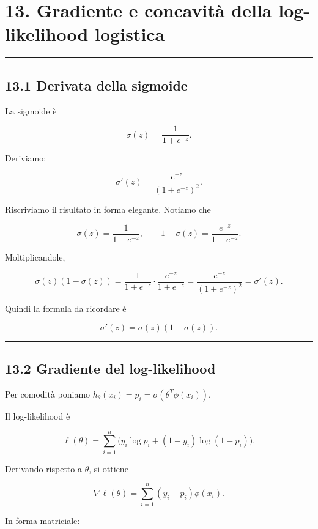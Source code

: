 \documentclass[
]{article}
\begin{document}
\section{13. Gradiente e concavità della log-likelihood
logistica}\label{gradiente-e-concavituxe0-della-log-likelihood-logistica}

\begin{center}\rule{0.5\linewidth}{0.5pt}\end{center}

\subsection{13.1 Derivata della sigmoide}\label{derivata-della-sigmoide}

La sigmoide è

\[
\sigma(z)=\frac{1}{1+e^{-z}}.
\]

Deriviamo:

\[
\sigma'(z)
=
\frac{e^{-z}}{(1+e^{-z})^2}.
\]

Riscriviamo il risultato in forma elegante. Notiamo che

\[
\sigma(z)=\frac{1}{1+e^{-z}},
\qquad
1-\sigma(z)=\frac{e^{-z}}{1+e^{-z}}.
\]

Moltiplicandole,

\[
\sigma(z)(1-\sigma(z))
=
\frac{1}{1+e^{-z}}
\cdot
\frac{e^{-z}}{1+e^{-z}}
=
\frac{e^{-z}}{(1+e^{-z})^2}
=
\sigma'(z).
\]

Quindi la formula da ricordare è

\[
\sigma'(z)=\sigma(z)(1-\sigma(z)).
\]

\begin{center}\rule{0.5\linewidth}{0.5pt}\end{center}

\subsection{13.2 Gradiente del
log-likelihood}\label{gradiente-del-log-likelihood}

Per comodità poniamo \(h_\theta(x_i)=p_i=\sigma(\theta^T\phi(x_i))\).

Il log-likelihood è

\[
\ell(\theta)=\sum_{i=1}^n\Big(y_i\log p_i + (1-y_i)\log(1-p_i)\Big).
\]

Derivando rispetto a \(\theta\), si ottiene

\[
\nabla \ell(\theta)
=
\sum_{i=1}^n (y_i-p_i)\phi(x_i).
\]

In forma matriciale:
\end{document}
